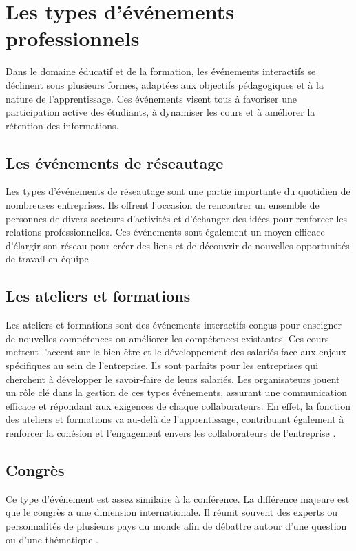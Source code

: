\section{Les types d'événements professionnels}
Dans le domaine éducatif et de la formation, les événements interactifs se déclinent
sous plusieurs formes, adaptées aux objectifs pédagogiques et à la nature de l'apprentissage.
Ces événements visent tous à favoriser une participation active des étudiants, à dynamiser les 
cours et à améliorer la rétention des informations.



\subsection{Les événements de réseautage}
Les types d'événements de réseautage sont une partie 
importante du quotidien de nombreuses entreprises.
Ils offrent l'occasion de rencontrer un ensemble 
de personnes de divers secteurs d'activités et d'échanger 
des idées pour renforcer les relations professionnelles.
Ces événements sont également un moyen efficace d'élargir 
son réseau pour créer des liens et de découvrir de nouvelles 
opportunités de travail en équipe\cite{evenementsprofessionnel}.
\subsection{Les ateliers et formations}

Les ateliers et formations sont des événements interactifs 
conçus pour enseigner de nouvelles compétences ou améliorer
les compétences existantes.
Ces cours mettent l'accent sur le bien-être et le développement
des salariés face aux enjeux spécifiques au sein de l'entreprise.
Ils sont parfaits pour les entreprises qui cherchent à développer 
le savoir-faire de leurs salariés.
Les organisateurs jouent un rôle clé dans la gestion de ces types 
événements, assurant une communication efficace et répondant aux 
exigences de chaque collaborateurs.
En effet, la fonction des ateliers et formations va au-delà de 
l'apprentissage, contribuant également à renforcer la cohésion 
et l'engagement envers les collaborateurs de l'entreprise \cite{evenementsprofessionnel}.
\subsection{ Congrès}
Ce type d’événement est assez similaire
à la conférence. La différence majeure 
est que le congrès a une dimension
internationale. Il réunit souvent 
des experts ou personnalités de plusieurs 
pays du monde afin de débattre autour d’une 
question ou d’une thématique \cite{evenement}.
